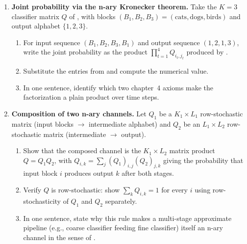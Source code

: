 \begin{enumerate}
\item \exstarstar
\label{ex:ch9-5}
\textbf{Joint probability via the n-ary Kronecker theorem.}
Take the $K = 3$ classifier matrix $Q$ of , with
blocks $(B_1, B_2, B_3) = (\text{cats}, \text{dogs}, \text{birds})$
and output alphabet $\{1, 2, 3\}$.
\begin{enumerate}
  \item[(a)] For input sequence $(B_1, B_2, B_3, B_1)$ and output
    sequence $(1, 2, 1, 3)$, write the joint probability as the
    product $\prod_{t = 1}^{4} Q_{i_t, j_t}$ produced by
    .
  \item[(b)] Substitute the entries from  and
    compute the numerical value.
  \item[(c)] In one sentence, identify which two chapter~4 axioms
    make the factorization a plain product over time steps.
\end{enumerate}

\item \exstarstar
\label{ex:ch9-6}
\textbf{Composition of two n-ary channels.}
Let $Q_1$ be a $K_1 \times L_1$ row-stochastic matrix (input
blocks $\to$ intermediate alphabet) and $Q_2$ be an $L_1 \times
L_2$ row-stochastic matrix (intermediate $\to$ output).
\begin{enumerate}
  \item[(a)] Show that the composed channel is the $K_1 \times
    L_2$ matrix product $Q = Q_1 Q_2$, with $Q_{i, k} = \sum_{j}
    (Q_1)_{i, j} (Q_2)_{j, k}$ giving the probability that input
    block $i$ produces output $k$ after both stages.
  \item[(b)] Verify $Q$ is row-stochastic: show $\sum_{k}
    Q_{i, k} = 1$ for every $i$ using row-stochasticity of $Q_1$
    and $Q_2$ separately.
  \item[(c)] In one sentence, state why this rule makes a
    multi-stage approximate pipeline (e.g., coarse classifier
    feeding fine classifier) itself an n-ary channel in the
    sense of .
\end{enumerate}


\end{enumerate}
